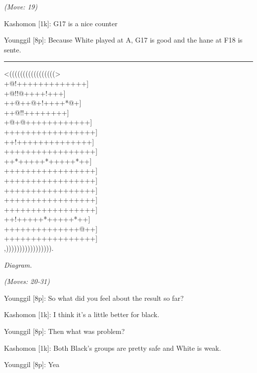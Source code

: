 \documentclass[letterpaper,12pt]{memoir}
\newcounter{GoFigure}[part]
\newcommand{\gofigure}{%
 \stepcounter{GoFigure}
 \centerline{\textit{Diagram.\thinspace\arabic{GoFigure}}}
}
\newcommand{\subtext}[1]{\centerline{\textit{#1}}}
\begin{document}
\subtext{(Move: 19)}

Kashomon [1k]: G17 is a nice counter

Younggil [8p]: Because White played at A, G17 is good and the hane at F18 is sente.


\vfill

\rule{\textwidth}{0.5pt}

\begin{minipage}[t]{0.5\textwidth}
{\gnos
<(((((((((((((((((>\\
+@!+++++++++++++]\\
+@!!@++++!+++]\\
++@++@+!++++*@+]\\
++@!!++++++++]\\
+@+@++++++++++++]\\
+++++++++++++++++]\\
++!++++++++++++++]\\
+++++++++++++++++]\\
++*+++++*+++++*++]\\
+++++++++++++++++]\\
+++++++++++++++++]\\
+++++++++++++++++]\\
+++++++++++++++++]\\
+++++++++++++++++]\\
++!+++++*+++++*++]\\
++++++++++++++@++]\\
+++++++++++++++++]\\
,))))))))))))))))).\\
}
\gofigure

\subtext{(Moves: 20-31)}
\end{minipage}
\begin{minipage}[t]{0.5\textwidth}
\setlength{\parskip}{0.5em}
Younggil [8p]: So what did you feel about the result so far?

Kashomon [1k]: I think it's a little better for black.

Younggil [8p]: Then what was problem?

Kashomon [1k]: Both Black's groups are pretty safe and White is weak.

Younggil [8p]: Yea


\end{minipage}
\vfill
\end{document}
